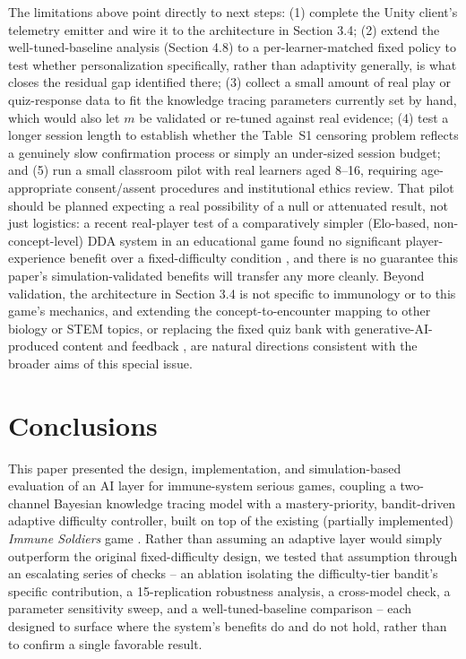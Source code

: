 \documentclass[11pt]{article}
\begin{document}
The limitations above point directly to next steps: (1) complete the Unity client's telemetry emitter and wire it to the architecture in Section 3.4; (2) extend the well-tuned-baseline analysis (Section 4.8) to a per-learner-matched fixed policy to test whether personalization specifically, rather than adaptivity generally, is what closes the residual gap identified there; (3) collect a small amount of real play or quiz-response data to fit the knowledge tracing parameters currently set by hand, which would also let $m$ be validated or re-tuned against real evidence; (4) test a longer session length to establish whether the Table~S1 censoring problem reflects a genuinely slow confirmation process or simply an under-sized session budget; and (5) run a small classroom pilot with real learners aged 8--16, requiring age-appropriate consent/assent procedures and institutional ethics review. That pilot should be planned expecting a real possibility of a null or attenuated result, not just logistics: a recent real-player test of a comparatively simpler (Elo-based, non-concept-level) DDA system in an educational game found no significant player-experience benefit over a fixed-difficulty condition \cite{ref42}, and there is no guarantee this paper's simulation-validated benefits will transfer any more cleanly. Beyond validation, the architecture in Section 3.4 is not specific to immunology or to this game's mechanics, and extending the concept-to-encounter mapping to other biology or STEM topics, or replacing the fixed quiz bank with generative-AI-produced content and feedback \cite{ref1,ref2,ref10}, are natural directions consistent with the broader aims of this special issue.

\section{Conclusions}

This paper presented the design, implementation, and simulation-based evaluation of an AI layer for immune-system serious games, coupling a two-channel Bayesian knowledge tracing model with a mastery-priority, bandit-driven adaptive difficulty controller, built on top of the existing (partially implemented) \textit{Immune Soldiers} game \cite{ref9}. Rather than assuming an adaptive layer would simply outperform the original fixed-difficulty design, we tested that assumption through an escalating series of checks -- an ablation isolating the difficulty-tier bandit's specific contribution, a 15-replication robustness analysis, a cross-model check, a parameter sensitivity sweep, and a well-tuned-baseline comparison -- each designed to surface where the system's benefits do and do not hold, rather than to confirm a single favorable result.
\end{document}
